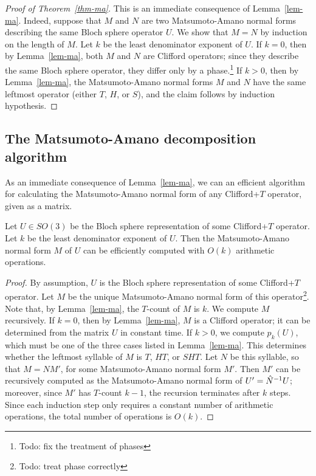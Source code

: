 \begin{proof}[Proof of Theorem~\vref{thm-ma}]
  This is an immediate consequence of Lemma~\ref{lem-ma}. Indeed, suppose that $M$ and $N$ are two
  Matsumoto-Amano normal forms describing the same Bloch sphere operator $U$. We show that $M=N$ by
  induction on the length of $M$. Let $k$ be the least denominator exponent of $U$. If $k=0$, then
  by Lemma~\ref{lem-ma}, both $M$ and $N$ are Clifford operators; since they describe the same
  Bloch sphere operator, they differ only by a phase.\footnote{Todo: fix the treatment of phases}
  If $k>0$, then by Lemma~\ref{lem-ma}, the Matsumoto-Amano normal forms $M$ and $N$ have the same
  leftmost operator (either $T$, $H$, or $S$), and the claim follows by induction hypothesis.
\end{proof}


\subsection{The Matsumoto-Amano decomposition algorithm} %
\label{sub:the_matsumoto_amano_decomposition_algorithm}
As an immediate consequence of Lemma~\vref{lem-ma}, we can an efficient algorithm for calculating
the Matsumoto-Amano normal form of any Clifford+$T$ operator, given as a matrix.

\begin{theorem}\label{thm:ma-decomposition}
  Let $U\in SO(3)$ be the Bloch sphere representation of some Clifford+$T$ operator. Let $k$ be the
  least denominator exponent of $U$. Then the Matsumoto-Amano normal form $M$ of $U$ can be
  efficiently computed with $O(k)$ arithmetic operations.
\end{theorem}

\begin{proof}
  By assumption, $U$ is the Bloch sphere representation of some Clifford+$T$ operator. Let $M$ be
  the unique Matsumoto-Amano normal form of this operator\footnote{Todo: treat phase correctly}.
  Note that, by Lemma~\vref{lem-ma}, the $T$-count of $M$ is $k$. We compute $M$ recursively. If
  $k=0$, then by Lemma~\vref{lem-ma}, $M$ is a Clifford operator; it can be determined from the
  matrix $U$ in constant time. If $k>0$, we compute $p_k(U)$, which must be one of the three cases
  listed in Lemma~\vref{lem-ma}. This determines whether the leftmost syllable of $M$ is $T$, $HT$,
  or $SHT$. Let $N$ be this syllable, so that $M=NM'$, for some Matsumoto-Amano normal form $M'$.
  Then $M'$ can be recursively computed as the Matsumoto-Amano normal form of $U'=\hat N^{-1} U$;
  moreover, since $M'$ has $T$-count $k-1$, the recursion terminates after $k$ steps. Since each
  induction step only requires a constant number of arithmetic operations, the total number of
  operations is $O(k)$.
\end{proof}

